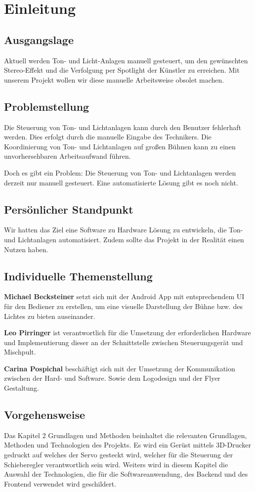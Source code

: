 \chapter{Einleitung}
\section{Ausgangslage}
Aktuell werden Ton- und Licht-Anlagen manuell gesteuert, um den gewünschten Stereo-Effekt und die Verfolgung per Spotlight der Künstler zu erreichen. Mit unserem Projekt wollen wir diese manuelle Arbeitsweise obsolet machen.

\section{Problemstellung}
Die Steuerung von Ton- und Lichtanlagen kann durch den Benutzer fehlerhaft werden. Dies erfolgt durch die manuelle Eingabe des Technikers. Die Koordinierung von Ton- und Lichtanlagen auf großen Bühnen kann zu einen unvorhersehbaren Arbeitsaufwand führen.

Doch es gibt ein Problem: Die Steuerung von Ton- und Lichtanlagen werden derzeit nur manuell gesteuert. Eine automatisierte Lösung gibt es noch nicht. 

\section{Persönlicher Standpunkt}
Wir hatten das Ziel eine Software zu Hardware Lösung zu entwickeln, die Ton- und Lichtanlagen automatisiert. Zudem sollte das Projekt in der Realität einen Nutzen haben.  

\section{Individuelle Themenstellung}
\textbf{Michael Becksteiner} setzt sich mit der Android App mit entsprechendem UI für den Bediener zu erstellen, um eine visuelle Darstellung der Bühne bzw. des Lichtes zu bieten auseinander. 

\textbf{Leo Pirringer} ist verantwortlich für die Umsetzung der erforderlichen Hardware und Implementierung dieser an der Schnittstelle zwischen Steuerungsgerät und Mischpult. 

\textbf{Carina Pospichal} beschäftigt sich mit der Umsetzung der Kommunikation zwischen der Hard- und Software. Sowie dem Logodesign und der Flyer Gestaltung. 

\section{Vorgehensweise} 
Das Kapitel 2 Grundlagen und Methoden beinhaltet die relevanten Grundlagen, Methoden und Technologien des Projekts. Es wird ein Gerüst mittels 3D-Drucker gedruckt auf welches der Servo gesteckt wird, welcher für die Steuerung der Schieberegler verantwortlich sein wird. Weiters wird in diesem Kapitel die Auswahl der Technologien, die für die Softwareanwendung, des Backend und des Frontend verwendet wird geschildert.  

